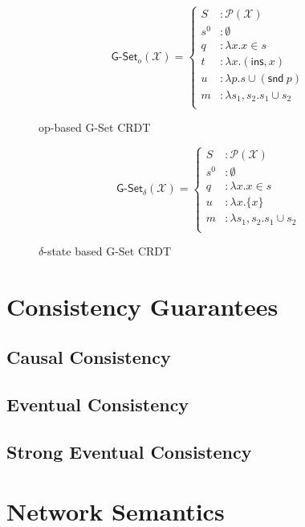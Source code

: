 \begin{figure}[H]
  \centering
  \[
    \textsf{G-Set}_o(\mathcal{X}) = \left\{\begin{aligned}
      S &: \mathcal{P}(\mathcal{X}) \\
      s^0 &: \emptyset \\
      q &: \lambda x. x \in s \\
      t &: \lambda x. (\textsf{ins}, x) \\
      u &: \lambda p. s \cup (\textsf{snd}~p) \\
      m &: \lambda s_1, s_2. s_1 \cup s_2 \\
    \end{aligned}\right.
  \]
  \caption{op-based \textsf{G-Set} CRDT}
\end{figure}

\begin{figure}[H]
  \centering
  \[
    \textsf{G-Set}_\delta(\mathcal{X}) = \left\{\begin{aligned}
      S &: \mathcal{P}(\mathcal{X}) \\
      s^0 &: \emptyset \\
      q &: \lambda x. x \in s \\
      u &: \lambda x. \{ x \} \\
      m &: \lambda s_1, s_2. s_1 \cup s_2 \\
    \end{aligned}\right.
  \]
  \caption{$\delta$-state based \textsf{G-Set} CRDT}
\end{figure}

\section{Consistency Guarantees}
\subsection{Causal Consistency}
\subsection{Eventual Consistency}
\subsection{Strong Eventual Consistency}
\section{Network Semantics}
